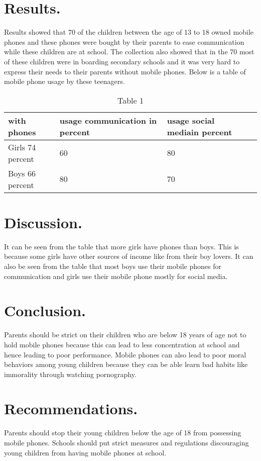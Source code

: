 \documentclass {article}
\begin{document}
\section{Results.}
Results showed that 70 of the children between the age of 13 to 18 owned mobile phones and these phones were bought by their parents to ease communication while these children are at school. The collection also showed that in the 70 most of these children were in boarding secondary schools and it was very hard to express their needs to their parents without mobile phones.
Below is a table of mobile phone usage by these teenagers.
\begin{table}[]
	\centering
	\caption{Table 1}
	\begin{tabular}{   |l | l | l|l    }
		\hline
		\bfseries { with phones} & \bfseries {usage communication in percent} & \bfseries {usage social mediain percent} \\  \hline
		Girls 74 percent & 60 & 80	\\
\hline
		Boys 66 percent& 80 &70 \\
		

\hline
	
	\end{tabular}
\end{table}



\section{Discussion.}
It can be seen from the table that more girls have phones than boys. This is because some girls have other sources of income like from their boy lovers. It can also be seen from the table that most boys use their mobile phones for communication and girls use their mobile phone mostly for social media.
\section{Conclusion.}
Parents should be strict on their children who are below 18 years of age not to hold mobile phones because this can lead to less concentration at school and hence leading to poor performance. Mobile phones can also lead to poor moral behaviors among young children because they can be able learn bad habits like immorality through watching pornography.
\section{Recommendations.}
Parents should stop their young children below the age of 18 from possessing mobile phones.
Schools should put strict measures and regulations discouraging young children from having mobile phones at school.
\end{document}
